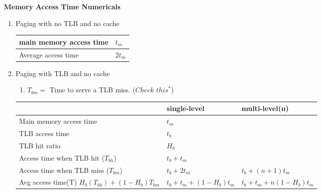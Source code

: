 \centerline{\textbf{ \LARGE Memory Access Time Numericals}}




\begin{enumerate}

    \item Paging with no TLB and no cache

        \begin{myTableStyle}
            \begin{tabular}{ |m{8cm}|m{4cm}| } \hline
                main memory access time             &     \(t_m\)     \\ \hline
                Average access time                 &     2\(t_m\)    \\ \hline
            \end{tabular}
        \end{myTableStyle}
        \vspace{0.08in}

    \item Paging with TLB and no cache
    \begin{enumerate}  \item \(T_{bm} = \) Time to serve a TLB miss. (\(Check\) \(this^*\)) \end{enumerate}

        \begin{myTableStyle}
            \begin{tabular}{ |m{6cm}|m{4cm}|m{4cm}| } \hline
                                                      &   single-level & multi-level(n)    \\ \hline
                Main memory access time               &   \(t_m\)&                   \\ \hline
                TLB access time                       &   \(t_b\)&                   \\ \hline
                TLB hit ratio                         &   \(H_b\)&                   \\ \hline
                Access time when TLB hit (\(T_{bh}\)) &   \(t_b + t_m\)&             \\ \hline
                Access time when TLB miss (\(T_{bm}\))&   \(t_b + 2t_m\)& \(t_b + (n+1)t_m\)            \\ \hline

                \makecell[l]{ Avg access time(T) \\
                \(H_b(T_{bh}) + (1-H_b)T_{bm}\) }  &  \(t_b + t_m + (1-H_b)t_m\)&  \(t_b + t_m + n(1-H_b)t_m\) \\ \hline
            \end{tabular}
        \end{myTableStyle}
        \vspace{0.08in}


\end{enumerate}

